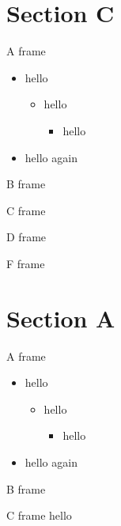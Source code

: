 \documentclass[aspectratio=43]{beamer}
\begin{document}
\section{Section C}
\begin{frame}{A frame}
\begin{itemize}
\item hello
\begin{itemize}
\item hello
\begin{itemize}
\item hello
\end{itemize}
\end{itemize}
\item hello again
\end{itemize}
\end{frame}
\begin{frame}{B frame}
\end{frame}
\begin{frame}{C frame}
\end{frame}
\begin{frame}{D frame}
\end{frame}
\begin{frame}{F frame}
\end{frame}

\section{Section A}
\begin{frame}{A frame}
\begin{itemize}
\item hello
\begin{itemize}
\item hello
\begin{itemize}
\item hello
\end{itemize}
\end{itemize}
\item hello again
\end{itemize}
\end{frame}
\begin{frame}{B frame}
\end{frame}
\begin{frame}{C frame}
  hello
\end{frame}
\end{document}

